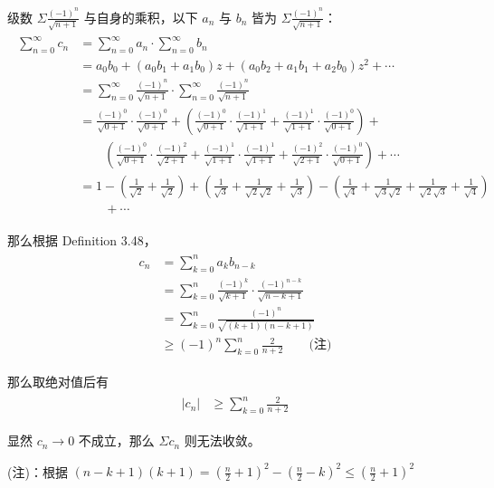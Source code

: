 \documentclass[../poma-notes.tex]{subfiles}
\begin{document}
\begin{anote}
  级数 $\Sigma \frac{(-1)^n}{\sqrt{n+1}}$ 与自身的乘积，以下 $a_n$ 与 $b_n$ 皆为 $\Sigma \frac{(-1)^n}{\sqrt{n+1}}$：
  \begin{align*}
    \begin{split}
      \sum_{n=0}^{\infty} c_n & = \sum_{n=0}^{\infty} a_n \cdot \sum_{n=0}^{\infty} b_n \\
      & = a_0b_0 + (a_0b_1 + a_1b_0)z + (a_0b_2+a_1b_1+a_2b_0)z^2 + \cdots \\
      & = \sum_{n=0}^{\infty} \frac{(-1)^n}{\sqrt{n+1}} \cdot \sum_{n=0}^{\infty} \frac{(-1)^n}{\sqrt{n+1}} \\
      & = \frac{(-1)^0}{\sqrt{0+1}} \cdot \frac{(-1)^0}{\sqrt{0+1}} + (\frac{(-1)^0}{\sqrt{0+1}}
      \cdot \frac{(-1)^1}{\sqrt{1+1}} + \frac{(-1)^1}{\sqrt{1+1}} \cdot \frac{(-1)^0}{\sqrt{0+1}}) + \\
      & \qquad (\frac{(-1)^0}{\sqrt{0+1}} \cdot \frac{(-1)^2}{\sqrt{2+1}} + \frac{(-1)^1}{\sqrt{1+1}} \cdot
      \frac{(-1)^1}{\sqrt{1+1}} + \frac{(-1)^2}{\sqrt{2+1}} \cdot \frac{(-1)^0}{\sqrt{0+1}}) + \cdots \\
      & = 1 - (\frac{1}{\sqrt{2}}+\frac{1}{\sqrt{2}}) + (\frac{1}{\sqrt{3}} + \frac{1}{\sqrt{2}\sqrt{2}} +
      \frac{1}{\sqrt{3}}) - (\frac{1}{\sqrt{4}} + \frac{1}{\sqrt{3}\sqrt{2}} + \frac{1}{\sqrt{2}\sqrt{3}} +
      \frac{1}{\sqrt{4}}) \\ & \qquad + \cdots
    \end{split}
  \end{align*}

  那么根据 Definition 3.48，
  \begin{align*}
    \begin{split}
      c_n & = \sum_{k=0}^{n} a_k b_{n-k} \\
      & = \sum_{k=0}^{n} \frac{(-1)^k}{\sqrt{k+1}} \cdot \frac{(-1)^{n-k}}{\sqrt{n-k+1}} \\
      & = \sum_{k=0}^{n} \frac{(-1)^n}{\sqrt{(k+1)(n-k+1)}} \\
      & \ge (-1)^n \sum_{k=0}^{n} \frac{2}{n+2} \qquad \text{(注)}
    \end{split}
  \end{align*}

  那么取绝对值后有
  \begin{align*}
    \begin{split}
      |c_n| & \ge \sum_{k=0}^{n} \frac{2}{n+2}
    \end{split}
  \end{align*}

  显然 $c_n \to 0$ 不成立，那么 $\Sigma c_n$ 则无法收敛。

  (注)：根据 $(n-k+1)(k+1) = (\frac{n}{2}+1)^2 - (\frac{n}{2}-k)^2 \le (\frac{n}{2}+1)^2$
\end{anote}
\end{document}
